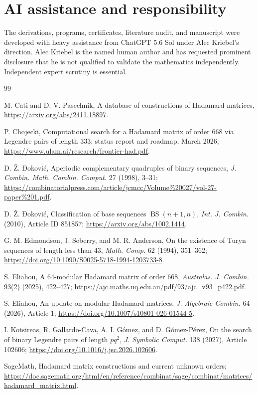 \documentclass[11pt]{article}
\newcommand{\BS}{\operatorname{BS}}
\begin{document}
\section*{AI assistance and responsibility}

The derivations, programs, certificates, literature audit, and manuscript
were developed with heavy assistance from ChatGPT 5.6 Sol under Alec
Kriebel's direction.  Alec Kriebel is the named human author and has
requested prominent disclosure that he is not qualified to validate the
mathematics independently.  Independent expert scrutiny is essential.

\begin{thebibliography}{99}
\small
\setlength{\itemsep}{0.25em}

M. Cati and D. V. Pasechnik,
A database of constructions of Hadamard matrices,
\url{https://arxiv.org/abs/2411.18897}.

P. Chojecki,
Computational search for a Hadamard matrix of order 668 via Legendre pairs
of length 333: status report and roadmap,
March 2026;
\url{https://www.ulam.ai/research/frontier-had.pdf}.

D. Ž. Đoković,
Aperiodic complementary quadruples of binary sequences,
\emph{J. Combin. Math. Combin. Comput.} 27 (1998), 3--31;
\url{https://combinatorialpress.com/article/jcmcc/Volume%20027/vol-27-paper%201.pdf}.

D. Ž. Đoković,
Classification of base sequences $\BS(n+1,n)$,
\emph{Int. J. Combin.} (2010), Article ID 851857;
\url{https://arxiv.org/abs/1002.1414}.

G. M. Edmondson, J. Seberry, and M. R. Anderson,
On the existence of Turyn sequences of length less than 43,
\emph{Math. Comp.} 62 (1994), 351--362;
\url{https://doi.org/10.1090/S0025-5718-1994-1203733-8}.

S. Eliahou,
A 64-modular Hadamard matrix of order 668,
\emph{Australas. J. Combin.} 93(2) (2025), 422--427;
\url{https://ajc.maths.uq.edu.au/pdf/93/ajc_v93_p422.pdf}.

S. Eliahou,
An update on modular Hadamard matrices,
\emph{J. Algebraic Combin.} 64 (2026), Article 1;
\url{https://doi.org/10.1007/s10801-026-01544-5}.

I. Kotsireas, R. Gallardo-Cava, A. I. Gómez, and D. Gómez-Pérez,
On the search of binary Legendre pairs of length $pq^2$,
\emph{J. Symbolic Comput.} 138 (2027), Article 102606;
\url{https://doi.org/10.1016/j.jsc.2026.102606}.

SageMath,
Hadamard matrix constructions and current unknown orders;
\url{https://doc.sagemath.org/html/en/reference/combinat/sage/combinat/matrices/hadamard_matrix.html}.

\end{thebibliography}
\end{document}
